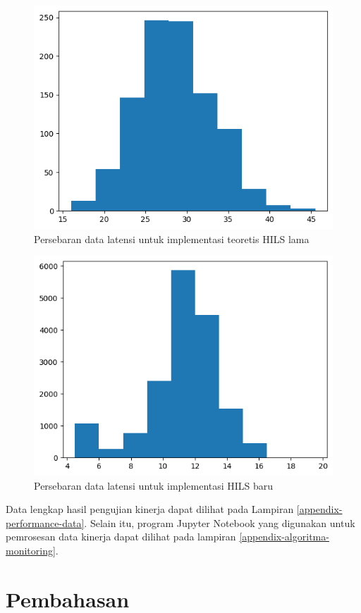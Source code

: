 \begin{figure}[!htbp]
	\centering
	\includegraphics[width=1.0\textwidth]{resources/chapter-4/old-hils-data.png}
	\caption{Persebaran data latensi untuk implementasi teoretis HILS lama}
	\label{chapter-4-fig-perf-result-old-hils}
\end{figure}
\begin{figure}[!htbp]
	\centering
	\includegraphics[width=1.0\textwidth]{resources/chapter-4/new-hils-data.png}
	\caption{Persebaran data latensi untuk implementasi HILS baru}
	\label{chapter-4-fig-perf-result-new-hils}
\end{figure}

Data lengkap hasil pengujian kinerja dapat dilihat pada Lampiran
\ref{appendix-performance-data}. Selain itu, program Jupyter Notebook yang
digunakan untuk pemrosesan data kinerja dapat dilihat pada lampiran
\ref{appendix-algoritma-monitoring}.

\section{Pembahasan}
\blindtext
